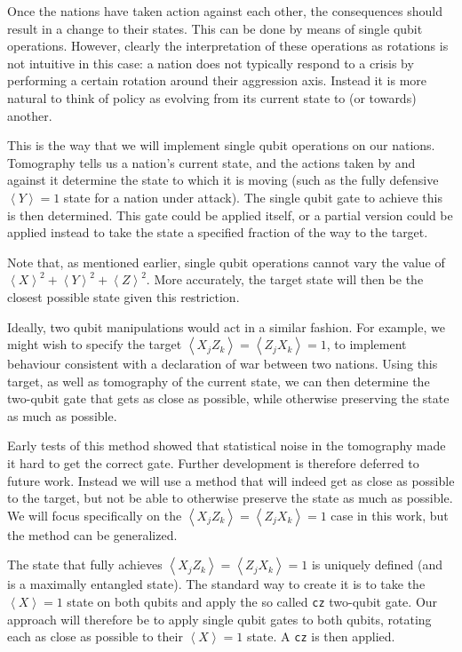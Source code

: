 \documentclass[conference]{IEEEtran}
\begin{document}
Once the nations have taken action against each other, the consequences should result in a change to their states. This can be done by means of single qubit operations. However, clearly the interpretation of these operations as rotations is not intuitive in this case: a nation does not typically respond to a crisis by performing a certain rotation around their aggression axis. Instead it is more natural to think of policy as evolving from its current state to (or towards) another.

This is the way that we will implement single qubit operations on our nations. Tomography tells us a nation's current state, and the actions taken by and against it determine the state to which it is moving (such as the fully defensive $\left\langle Y\right\rangle=1$ state for a nation under attack). The single qubit gate to achieve this is then determined. This gate could be applied itself, or a partial version could be applied instead to take the state a specified fraction of the way to the target.

Note that, as mentioned earlier, single qubit operations cannot vary the value of $ \left\langle X\right\rangle^2 + \left\langle Y\right\rangle^2+ \left\langle Z\right\rangle^2$. More accurately, the target state will then be the closest possible state given this restriction.

Ideally, two qubit manipulations would act in a similar fashion. For example, we might wish to specify the target $\left\langle X_j Z_k\right\rangle=\left\langle Z_j X_k \right\rangle=1$, to implement behaviour consistent with a declaration of war between two nations. Using this target, as well as tomography of the current state, we can then determine the two-qubit gate that gets as close as possible, while otherwise preserving the state as much as possible.

Early tests of this method showed that statistical noise in the tomography made it hard to get the correct gate. Further development is therefore deferred to future work. Instead we will use a method that will indeed get as close as possible to the target, but not be able to otherwise preserve the state as much as possible. We will focus specifically on the $\left\langle X_j Z_k\right\rangle=\left\langle Z_j X_k\right\rangle=1$ case in this work, but the method can be generalized.

The state that fully achieves $\left\langle X_j Z_k \right\rangle=\left\langle Z_j X_k\right\rangle=1$ is uniquely defined (and is a maximally entangled state). The standard way to create it is to take the $\left\langle X\right\rangle=1$ state on both qubits and apply the so called \texttt{cz} two-qubit gate. Our approach will therefore be to apply single qubit gates to both qubits, rotating each as close as possible to their $\left\langle X\right\rangle=1$ state. A \texttt{cz} is then applied.
\end{document}
